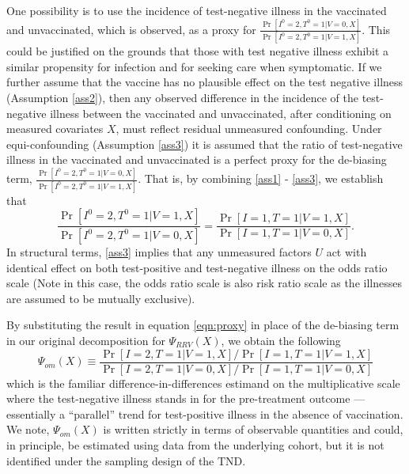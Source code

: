 \documentclass[11pt]{article}
\begin{document}
One possibility is to use the incidence of test-negative illness in the vaccinated and unvaccinated, which is observed, as a proxy for $\frac{\Pr[I^0 = 2, T^0 = 1 | V = 0, X]}{\Pr[I^0 = 2, T^0 = 1 | V = 1, X]}$. This could be justified on the grounds that those with test negative illness exhibit a similar propensity for infection and for seeking care when symptomatic. If we further assume that the vaccine has no plausible effect on the test negative illness (Assumption \ref{ass2}), then any observed difference in the incidence of the test-negative illness between the vaccinated and unvaccinated, after conditioning on measured covariates $X$, must reflect residual unmeasured confounding. Under equi-confounding (Assumption \ref{ass3}) it is assumed that the ratio of test-negative illness in the vaccinated and unvaccinated is a perfect proxy for the de-biasing term, $\frac{\Pr[I^0 = 2, T^0 = 1 | V = 0, X]}{\Pr[I^0 = 2, T^0 = 1 | V = 1, X]}$. That is, by combining \ref{ass1} - \ref{ass3}, we establish that 
\begin{equation}\label{eqn:proxy}
     \dfrac{\Pr[I^0 = 2, T^0 = 1  | V = 1, X]}{\Pr[I^0 = 2, T^0 = 1 | V = 0, X]} = \frac{\Pr[I = 1, T = 1  | V = 1, X]}{\Pr[I = 1, T = 1  | V = 0, X]}.
\end{equation}
In structural terms, \ref{ass3} implies that any unmeasured factors $U$ act with identical effect on both test-positive and test-negative illness on the odds ratio scale (Note in this case, the odds ratio scale is also risk ratio scale as the illnesses are assumed to be mutually exclusive). 
    

By substituting the result in equation \ref{eqn:proxy} in place of the de-biasing term in our original decomposition for $\Psi_{RRV}(X)$, we obtain the following 
    \begin{equation}\label{eqn:or_estimand}
         \Psi_{om}(X) \equiv \dfrac{\Pr[I = 2, T = 1 | V = 1, X]/\Pr[I = 1, T = 1 | V = 1, X]}{\Pr[I = 2, T = 1 | V = 0, X]/\Pr[I = 1, T = 1 | V = 0, X]}
    \end{equation}
which is the familiar difference-in-differences estimand on the multiplicative scale where the test-negative illness stands in for the pre-treatment outcome --- essentially a ``parallel'' trend for test-positive illness in the absence of vaccination. We note, $\Psi_{om}(X)$ is written strictly in terms of observable quantities and could, in principle, be estimated using data from the underlying cohort, but it is not identified under the sampling design of the TND. 
\end{document}
